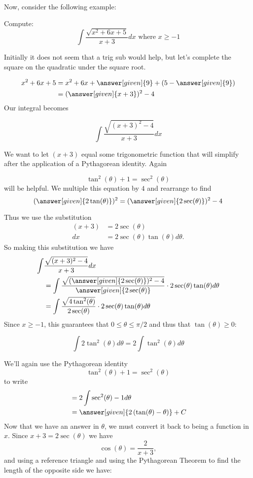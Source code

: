 \documentclass{ximera}
\begin{document}
Now, consider the following example:


\begin{example}
  Compute:
  \[
  \int \frac{\sqrt{x^2+6x+5}}{x+3}dx \text{ where } x \geq -1
  \]

  \begin{explanation}
  Initially it does not seem that a trig sub would help, but let's complete the square on the quadratic under the square root.

    \begin{align*}
      x^2+6x+5 &= x^2+6x+\answer[given]{9}+(5-\answer[given]{9})\\
      &= (\answer[given]{x+3})^2-4
    \end{align*}
    Our integral becomes

    \[
    \int \frac{\sqrt{(x+3)^2-4}}{x+3}dx
    \]

    We want to let $(x+3)$ equal some trigonometric
    function that will simplify after the application of a
    Pythagorean identity. Again 

    \[
    \tan^2(\theta) + 1 = \sec^2(\theta)
    \]
    will be helpful. We multiple this equation by $4$ and rearrange to find
    \[
    (\answer[given]{2\tan(\theta)})^2 = (\answer[given]{2\sec(\theta)})^2 - 4
    \]

    Thus we use the substitution 
    \begin{align*}
      (x+3) &=  2\sec(\theta)\\
      dx &= 2\sec(\theta)\tan(\theta) d\theta.
    \end{align*}
    So making this substitution we have
    \begin{align*}
      \int &\frac{\sqrt{(x+3)^2-4}}{x+3}dx \\
      &= \int\frac{\sqrt{(\answer[given]{2\sec(\theta)})^2-4}}{\answer[given]{2\sec(\theta)}} \cdot 2\sec(\theta)\tan(\theta)d\theta\\
      &= \int\frac{\sqrt{4\tan^{2}(\theta)}}{2\sec(\theta)} \cdot 2\sec(\theta)\tan(\theta)d\theta\\
    \end{align*}
    Since $x\geq -1$, this guarantees that $0\leq \theta \leq \pi/2$ and thus that 
$\tan(\theta) \geq 0$:

    \[
    \int 2 \tan^2(\theta) d\theta = 2\int \tan^2(\theta) d\theta
    \]

    We'll again use the Pythagorean identity
    \[
    \tan^2(\theta) + 1 = \sec^2(\theta)
    \]
    to write
    \begin{align*}
      &= 2\int \sec^2(\theta) - 1 d\theta\\
      &= \answer[given]{2\left(\tan(\theta) - \theta\right)} + C
    \end{align*}
    Now that we have an answer in $\theta$, we must convert it back to
    being a function in $x$. Since $x+3 = 2\sec(\theta)$ we have
    \[
    \cos(\theta) = \frac{2}{x+3},
    \]
    and using a reference triangle and using the Pythagorean Theorem
to find the length of the opposite side we have:
   




\end{explanation}
\end{example}
\end{document}

